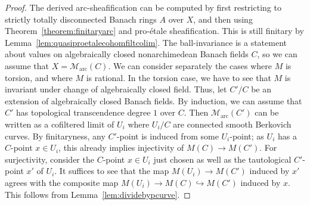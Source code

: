 \documentclass[11pt]{amsart}
\numberwithin{equation}{section}
\numberwithin{theorem}{section}
\theoremstyle{definition}
\begin{document}
\begin{proof} The derived arc-sheafification can be computed by first restricting to strictly totally disconnected Banach rings $A$ over $X$, and then using Theorem~\ref{theorem:finitaryarc} and pro-\'etale sheafification. This is still finitary by Lemma~\ref{lem:quasiproetalecohomfiltcolim}. The ball-invariance is a statement about values on algebraically closed nonarchimedean Banach fields $C$, so we can assume that $X=\mathcal M_{\mathrm{arc}}(C)$. We can consider separately the cases where $M$ is torsion, and where $M$ is rational. In the torsion case, we have to see that $M$ is invariant under change of algebraically closed field. Thus, let $C'/C$ be an extension of algebraically closed Banach fields. By induction, we can assume that $C'$ has topological transcendence degree $1$ over $C$. Then $\mathcal M_{\mathrm{arc}}(C')$ can be written as a cofiltered limit of $U_i$ where $U_i/C$ are connected smooth Berkovich curves. By finitaryness, any $C'$-point is induced from some $U_i$-point; as $U_i$ has a $C$-point $x\in U_i$, this already implies injectivity of $M(C)\to M(C')$. For surjectivity, consider the $C$-point $x\in U_i$ just chosen as well as the tautological $C'$-point $x'$ of $U_i$. It suffices to see that the map $M(U_i)\to M(C')$ induced by $x'$ agrees with the composite map $M(U_i)\to M(C)\hookrightarrow M(C')$ induced by $x$. This follows from Lemma~\ref{lem:dividebypcurve}.


\end{proof}
\end{document}
